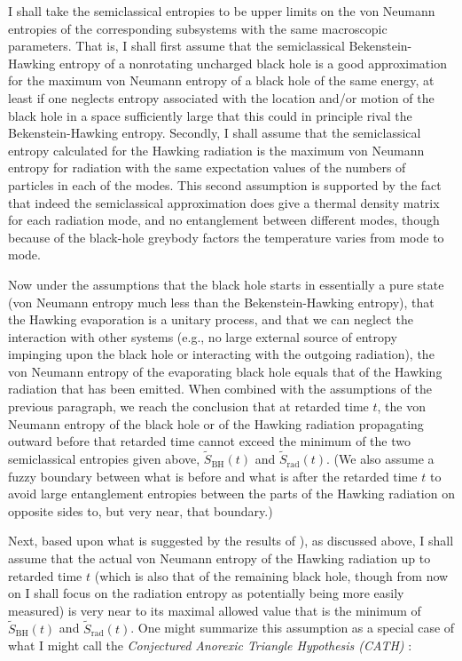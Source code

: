 \documentclass[12pt]{article}
\begin{document}
I shall take the semiclassical entropies to be upper limits on the von Neumann entropies of the corresponding subsystems with the same macroscopic parameters.  That is, I shall first assume that the semiclassical Bekenstein-Hawking entropy of a nonrotating uncharged black hole is a good approximation for the maximum von Neumann entropy of a black hole of the same energy, at least if one neglects entropy associated with the location and/or motion of the black hole in a space sufficiently large that this could in principle rival the Bekenstein-Hawking entropy.  Secondly, I shall assume that the semiclassical entropy calculated for the Hawking radiation is the maximum von Neumann entropy for radiation with the same expectation values of the numbers of particles in each of the modes.  This second assumption is supported by the fact that indeed the semiclassical approximation does give a thermal density matrix for each radiation mode, and no entanglement between different modes, though because of the black-hole greybody factors the temperature varies from mode to mode.

Now under the assumptions that the black hole starts in essentially a pure state (von Neumann entropy much less than the Bekenstein-Hawking entropy), that the Hawking evaporation is a unitary process, and that we can neglect the interaction with other systems (e.g., no large external source of entropy impinging upon the black hole or interacting with the outgoing radiation), the von Neumann entropy of the evaporating black hole equals that of the Hawking radiation that has been emitted.  When combined with the assumptions of the previous paragraph, we reach the conclusion that at retarded time $t$, the von Neumann entropy of the black hole or of the Hawking radiation propagating outward before that retarded time cannot exceed the minimum of the two semiclassical entropies given above, $\tilde{S}_\mathrm{BH}(t)$ and $\tilde{S}_\mathrm{rad}(t)$.  (We also assume a fuzzy boundary between what is before and what is after the retarded time $t$ to avoid large entanglement entropies between the parts of the Hawking radiation on opposite sides to, but very near, that boundary.)

\newpage

Next, based upon what is suggested by the results of \cite{Page:1993df,Page:1993wv,Sekino:2008he,Susskind:2011ap,Lashkari:2011yi, Edalati:2012jj,Barbon:2012zv}), as discussed above, I shall assume that the actual von Neumann entropy of the Hawking radiation up to retarded time $t$ (which is also that of the remaining black hole, though from now on I shall focus on the radiation entropy as potentially being more easily measured) is very near to its maximal allowed value that is the minimum of $\tilde{S}_\mathrm{BH}(t)$ and $\tilde{S}_\mathrm{rad}(t)$.  One might summarize this assumption as a special case of what I might call the {\it {Conjectured Anorexic Triangle Hypothesis (CATH)}} \cite{Cathy}:  
\end{document}
